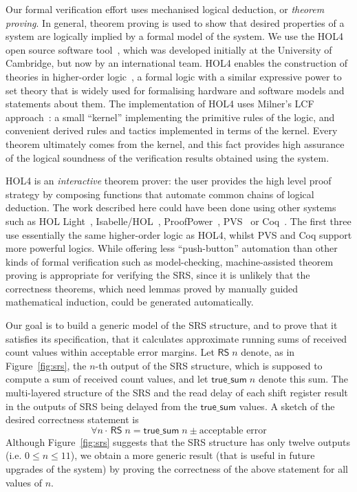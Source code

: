 \documentclass{llncs}
\begin{document}
Our formal verification effort uses mechanised logical deduction, or \emph{theorem proving}.
In general, theorem proving is used to show that desired properties of a system are logically implied by a formal model of the system.
We use the HOL4 open source software tool~\cite{HOL4,DBLP:conf/tphol/SlindN08}, which was developed initially at the University of Cambridge, but now by an international team.
HOL4 enables the construction of theories in higher-order logic~\cite{DBLP:journals/jsyml/Church40}, a formal logic with a similar expressive power to set theory that is widely used for formalising hardware and software models and statements about them.
The implementation of HOL4 uses Milner's LCF approach~\cite{Milner:1972:LCF:891954}: a small ``kernel'' implementing the primitive rules of the logic, and convenient derived rules and tactics implemented in terms of the kernel.
Every theorem ultimately comes from the kernel, and this fact provides high assurance of the logical soundness of the verification results obtained using the system.

HOL4 is an \emph{interactive} theorem prover: the user provides the high level proof strategy by composing functions that automate common chains of logical deduction.
The work described here could have been done using other systems such as HOL Light~\cite{HOLLight,DBLP:conf/tphol/Harrison09a}, Isabelle/HOL~\cite{Isabelle}, ProofPower~\cite{ProofPower}, PVS~\cite{PVS,DBLP:conf/tphol/OwreS08} or Coq~\cite{Coq}.
The first three use essentially the same higher-order logic as HOL4, whilst PVS and Coq support more powerful logics.
While offering less ``push-button'' automation than other kinds of formal verification such as model-checking, machine-assisted theorem proving is appropriate for verifying the SRS, since it is unlikely that the correctness theorems, which need lemmas proved by manually guided mathematical induction, could be generated automatically.

Our goal is to build a generic model of the SRS structure, and to prove that it satisfies its specification, that it calculates approximate running sums of received count values within acceptable error margins.
Let $\mathsf{RS}\;n$ denote, as in Figure~\ref{fig:srs}, the $n$-th output of the SRS structure, which is supposed to compute a sum of received count values, and let $\mathsf{true\_sum}\;n$ denote this sum.
The multi-layered structure of the SRS and the read delay of each shift register result in the outputs of SRS being delayed from the $\mathsf{true\_sum}$ values.
A sketch of the desired correctness statement is \[\forall{n} \cdot \, \mathsf{RS}\;n= \mathsf{true\_sum}\; n \pm\text{acceptable error}\]
Although Figure~\ref{fig:srs} suggests that the SRS structure has only twelve outputs  (i.e. $0\leq{n}\leq11$), we obtain a more generic result (that is useful in future upgrades of the system) by proving the correctness of the above statement for all values of $n$.
\end{document}
